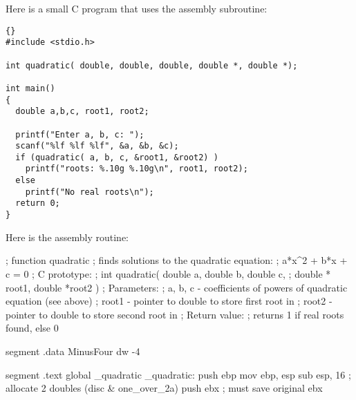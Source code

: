 {Here is a small C program that uses the assembly subroutine:
\begin{lstlisting}{}
#include <stdio.h>

int quadratic( double, double, double, double *, double *);

int main()
{
  double a,b,c, root1, root2;

  printf("Enter a, b, c: ");
  scanf("%lf %lf %lf", &a, &b, &c);
  if (quadratic( a, b, c, &root1, &root2) )
    printf("roots: %.10g %.10g\n", root1, root2);
  else
    printf("No real roots\n");
  return 0;
}
\end{lstlisting}

Here is the assembly routine:
\begin{AsmCodeListing}[label=quad.asm,commentchar=$]
; function quadratic
; finds solutions to the quadratic equation: 
;       a*x^2 + b*x + c = 0
; C prototype:
;   int quadratic( double a, double b, double c,
;                  double * root1, double *root2 )
; Parameters:
;   a, b, c - coefficients of powers of quadratic equation (see above)
;   root1   - pointer to double to store first root in
;   root2   - pointer to double to store second root in
; Return value:
;   returns 1 if real roots found, else 0


segment .data
MinusFour       dw      -4

segment .text
        global  _quadratic
_quadratic:
        push    ebp
        mov     ebp, esp
        sub     esp, 16         ; allocate 2 doubles (disc & one_over_2a)
        push    ebx             ; must save original ebx


\end{AsmCodeListing}}
